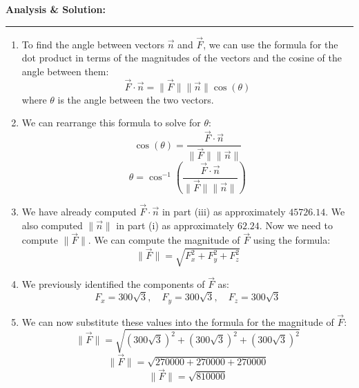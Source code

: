 \documentclass[12pt]{article} %
\numberwithin{equation}{section}
\begin{document}
\begin{enumerate}[label=\roman*.]
            \bigskip
            \hspace{0.5em}
            \textbf{Analysis \& Solution:}
            \begin{center}
            \rule{\linewidth}{1pt}
            \end{center}
            \begin{enumerate}[label=\arabic*.]
                \item To find the angle between vectors \(\vec{n}\) and \(\vec{F}\), we can use the formula for the dot product in terms of the magnitudes of the vectors and the cosine of the angle between them:
                    \[
                    \vec{F} \cdotp \vec{n} = \lVert \vec{F} \rVert \lVert \vec{n} \rVert \cos(\theta)
                    \]
                    where \(\theta\) is the angle between the two vectors.
                \item We can rearrange this formula to solve for \(\theta\):
                    \[
                    \cos(\theta) = \frac{\vec{F} \cdotp \vec{n}}{\lVert \vec{F} \rVert \lVert \vec{n} \rVert}
                    \]
                    \[
                    \theta = \cos^{-1}\left(\frac{\vec{F} \cdotp \vec{n}}{\lVert \vec{F} \rVert \lVert \vec{n} \rVert}\right)
                    \]
                \item We have already computed \(\vec{F} \cdotp \vec{n}\) in part (iii) as approximately \(45726.14\).
                    We also computed \(\lVert \vec{n} \rVert\) in part (i) as approximately \(62.24\).
                    Now we need to compute \(\lVert \vec{F} \rVert\).
                    We can compute the magnitude of \(\vec{F}\) using the formula:
                    \[
                    \lVert \vec{F} \rVert = \sqrt{F_x^2 + F_y^2 + F_z^2}
                    \]
                \item We previously identified the components of \(\vec{F}\) as:
                    \[
                    F_x = 300\sqrt{3}, \quad F_y = 300\sqrt{3}, \quad F_z = 300\sqrt{3}
                    \]
                \item We can now substitute these values into the formula for the magnitude of \(\vec{F}\):
                    \[
                    \lVert \vec{F} \rVert = \sqrt{(300\sqrt{3})^2 + (300\sqrt{3})^2 + (300\sqrt{3})^2}
                    \]
                    \[
                    \lVert \vec{F} \rVert = \sqrt{270000 + 270000 + 270000}
                    \]
                    \[
                    \lVert \vec{F} \rVert = \sqrt{810000}
                    \]

\end{enumerate}
\end{enumerate}
\end{document}
